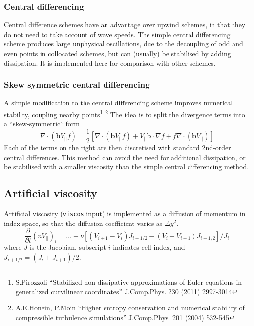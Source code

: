 \documentclass[12pt,a4paper]{article}
\begin{document}
\subsubsection{Central differencing}
\label{sec:central}

Central difference schemes have an advantage over upwind schemes, in that they do not need to take account
of wave speeds. The simple central differencing scheme produces large unphysical oscillations, due to the
decoupling of odd and even points in collocated schemes, but can (usually) be stabilised by adding dissipation. 
It is implemented here for comparison with other schemes.


\subsubsection{Skew symmetric central differencing}
\label{sec:skewform}

A simple modification to the central differencing scheme improves numerical stability, coupling nearby
points\footnote{S.Pirozzoli ``Stabilized non-dissipative approximations of Euler equations in generalized curvilinear coordinates'' J.Comp.Phys. 230 (2011) 2997-3014}
\footnote{A.E.Honein, P.Moin ``Higher entropy conservation and numerical stability of compressible turbulence simulations'' J.Comp.Phys. 201 (2004) 532-545}
The idea is to split the divergence terms into a ``skew-symmetric'' form
\begin{equation}
  \nabla\cdot\left(\mathbf{b} V_{||} f\right) = \frac{1}{2}\left[ \nabla\cdot\left(\mathbf{b} V_{||} f\right) + V_{||}\mathbf{b}\cdot\nabla f + f\nabla\cdot\left(\mathbf{b} V_{||}\right)\right]
\end{equation}
Each of the terms on the right are then discretised with standard 2nd-order central differences.
This method can avoid the need for additional dissipation, or be stabilised with a smaller viscosity than
the simple central differencing method.

\subsection{Artificial viscosity}
\label{sec:viscos}

Artificial viscosity (\texttt{viscos} input) is implemented as a diffusion of momentum in index space, so that the diffusion coefficient varies as $\Delta y^2$.
\begin{equation}
  \frac{\partial}{\partial t}\left(nV_{||}\right)_i = \ldots + \nu\left[ \left(V_{i+1} - V_i\right)J_{i+1/2} - \left(V_i - V_{i-1}\right)J_{i-1/2} \right]/J_i
\end{equation}
where $J$ is the Jacobian, subscript $i$ indicates cell index, and $J_{i+1/2} = \left(J_i + J_{i+1}\right)/2$.
\end{document}
